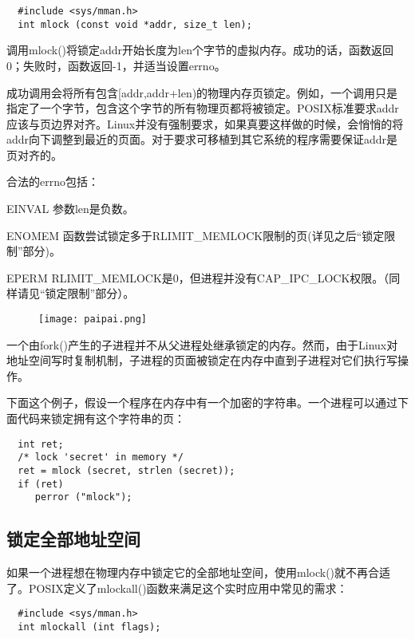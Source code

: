 \begin{lstlisting}
  #include <sys/mman.h>
  int mlock (const void *addr, size_t len);
\end{lstlisting}

调用mlock()将锁定addr开始长度为len个字节的虚拟内存。成功的话，函数返回0；失败时，函数返回-1，并适当设置errno。

成功调用会将所有包含[addr,addr+len)的物理内存页锁定。例如，一个调用只是指定了一个字节，包含这个字节的所有物理页都将被锁定。POSIX标准要求addr应该与页边界对齐。Linux并没有强制要求，如果真要这样做的时候，会悄悄的将addr向下调整到最近的页面。对于要求可移植到其它系统的程序需要保证addr是页对齐的。

合法的errno包括： 

\begin{eqlist*}
\item[EINVAL] 参数len是负数。 
\item[ENOMEM] 函数尝试锁定多于RLIMIT\_MEMLOCK限制的页(详见之后“锁定限制”部分)。
\item[EPERM] RLIMIT\_MEMLOCK是0，但进程并没有CAP\_IPC\_LOCK权限。（同样请见“锁定限制”部分）。
\end{eqlist*}

\begin{wrapfigure}{l}{2.5cm}
  \texttt{[image: paipai.png]}
\end{wrapfigure}
\mbox{}\begin{flushleft}一个由fork()产生的子进程并不从父进程处继承锁定的内存。然而，由于Linux对地址空间写时复制机制，子进程的页面被锁定在内存中直到子进程对它们执行写操作。 \end{flushleft}

下面这个例子，假设一个程序在内存中有一个加密的字符串。一个进程可以通过下面代码来锁定拥有这个字符串的页： 

\begin{lstlisting}
  int ret;
  /* lock 'secret' in memory */
  ret = mlock (secret, strlen (secret));
  if (ret)
     perror ("mlock");
\end{lstlisting}

\subsection{锁定全部地址空间}

如果一个进程想在物理内存中锁定它的全部地址空间，使用mlock()就不再合适了。POSIX定义了mlockall()函数来满足这个实时应用中常见的需求： 

\begin{lstlisting}
  #include <sys/mman.h>
  int mlockall (int flags);
\end{lstlisting}

